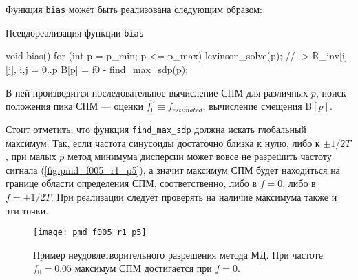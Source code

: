     Функция \texttt{bias} может быть реализована следующим образом:

    \begin{listing}
        \caption{Псевдореализация функции \texttt{bias}}
        \begin{cppcode}
            void bias()
            {
                for (int p = p_min; p <= p_max)
                {
                    levinson_solve(p); // -> R_inv[i][j], i,j = 0..p
                    B[p] = f0 - find_max_sdp(p);
                }
            }
        \end{cppcode}
    \end{listing}

    В ней производится последовательное вычисление СПМ для различных $p$, поиск положения пика СПМ --- оценки $\hat{f_0} \equiv f_{estimated}$, вычисление смещения $\mathrm{B}\left[p\right]$.

    Стоит отметить, что функция \texttt{find_max_sdp} должна искать глобальный максимум. Так, если частота синусоиды достаточно близка к нулю, либо к $\pm 1 / {2 T}$, при малых $p$ метод минимума дисперсии может вовсе не разрешить частоту сигнала (\autoref{fig:pmd_f005_r1_p5}), а значит максимум СПМ будет находиться на границе области определения СПМ, соответственно, либо в $f = 0$, либо в $f = \pm 1 / {2 T}$. При реализации следует проверять на наличие максимума также и эти точки.

    \begin{figure}
        \centering
        \texttt{[image: pmd\_f005\_r1\_p5]}
        \caption{Пример неудовлетворительного разрешения метода МД. При частоте $f_0=0.05$ максимум СПМ достигается при $f=0$.}
        \label{fig:pmd_f005_r1_p5}
    \end{figure}



